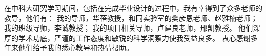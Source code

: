 
\begin{acknowledgements}

在中科大研究学习期间，包括在完成毕业设计的过程中，我有幸得到了众多老师的教导，他们有：
我的导师，华蓓教授，和同实验室的樊彦恩老师、赵雅楠老师；
我的班级导师，李诚教授；
我的项目相关导师，卢建良老师，邢凯教授。
他们深厚的学术功底，严谨的工作态度和敏锐的科学洞察力使我受益良多。
衷心感谢多年来他们给予我的悉心教导和热情帮助。

\end{acknowledgements}
